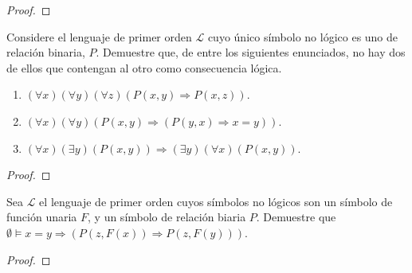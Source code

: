 \documentclass[12pt]{report}
\theoremstyle{largebreak}
\begin{document}
    \begin{proof}
    \end{proof}

    \begin{excer}
        Considere el lenguaje de primer orden $\mathcal{L}$ cuyo único símbolo no lógico es uno de relación binaria, $P$. Demuestre que, de entre los siguientes enunciados, no hay dos de ellos que contengan al otro como consecuencia lógica.
        \begin{enumerate}[label=$(\alph*)$]
            \item $(\forall x)(\forall y)(\forall z)(P(x,y)\Rightarrow P(x,z))$.
            \item $(\forall x)(\forall y)(P(x,y)\Rightarrow (P(y,x)\Rightarrow x=y))$.
            \item $(\forall x)(\exists y)(P(x,y))\Rightarrow(\exists y)(\forall x)(P(x,y))$.
        \end{enumerate} 
    \end{excer}

    \begin{proof}
    \end{proof}

    \begin{excer}
        Sea $\mathcal{L}$ el lenguaje de primer orden cuyos símbolos no lógicos son un símbolo de función unaria $F$, y un símbolo de relación biaria $P$. Demuestre que $\emptyset\vDash x=y\Rightarrow(P(z,F(x))\Rightarrow P(z,F(y)))$.
    \end{excer}

    \begin{proof}
    \end{proof}
\end{document}
